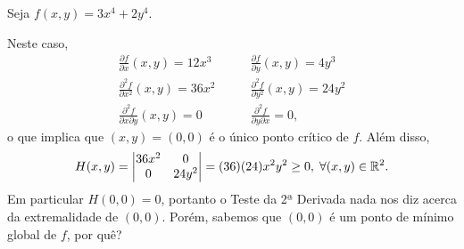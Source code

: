 \begin{example}
    Seja \(f(x,y) = 3x^4 + 2y^4\).

    Neste caso,
        \begin{align*}
            \frac{\partial f}{\partial x}(x,y) = 12x^3 \quad & \quad \frac{\partial f}{\partial y}(x,y) = 4y^3 \\
            \frac{\partial^2 f}{\partial x^2}(x,y) = 36x^2 \quad & \quad \frac{\partial^2 f}{\partial y^2}(x,y) = 24y^2 \\
            \frac{\partial^2 f}{\partial x \partial y}(x,y) = 0 \quad & \quad  \frac{\partial^2 f}{\partial y \partial x} = 0,
        \end{align*}
    o que implica que \((x,y) = (0,0)\) é o único ponto crítico de \(f\). Além disso, \[H(x,y) = \left|\begin{matrix}
        36x^2 & 0 \\ 0 & 24y^2
    \end{matrix}\right| = (36)(24)x^2 y^2 \geq 0,\; \forall (x,y)\in\mathbb{R}^2.\] Em particular \(H(0,0) = 0\), portanto o Teste da 2ª Derivada nada nos diz acerca da extremalidade de \((0,0)\). Porém, sabemos que \((0,0)\) é um ponto de mínimo global de \(f\), por quê?
\end{example}

